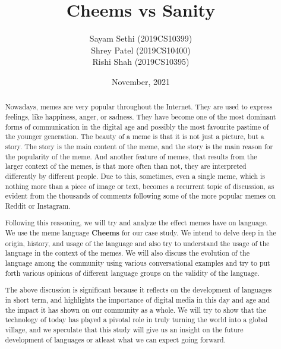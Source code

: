 \documentclass{article}
\title{Cheems vs Sanity}
\author{Sayam Sethi (2019CS10399)\\Shrey Patel (2019CS10400)\\Rishi Shah (2019CS10395)}
\date{November, 2021}
\begin{document}
\maketitle

\tableofcontents

\newpage

\begin{abstract}
    Nowadays, memes are very popular throughout the Internet. They are used to express feelings, like happiness, anger, or sadness. They have become one of the most dominant forms of communication in the digital age and possibly the most favourite pastime of the younger generation. The beauty of a meme is that it is not just a picture, but a story. The story is the main content of the meme, and the story is the main reason for the popularity of the meme. And another feature of memes, that results from the larger context of the memes,  is that more often than not, they are interpreted differently by different people. Due to this, sometimes, even a single meme, which is nothing more than a piece of image or text, becomes a recurrent topic of discussion, as evident from the thousands of comments following some of the more popular memes on Reddit or Instagram.

    Following this reasoning, we will try and analyze the effect memes have on language. We use the meme language \textbf{Cheems} for our case study. We intend to delve deep in the origin, history, and usage of the language and also try to understand the usage of the language in the context of the memes. We will also discuss the evolution of the language among the community using various conversational examples and try to put forth various opinions of different language groups on the validity of the language.

    The above discussion is significant because it reflects on the development of languages in short term, and highlights the importance of digital media in this day and age and the impact it has shown on our community as a whole. We will try to show that the technology of today has played a pivotal role in truly turning the world into a global village, and we speculate that this study will give us an insight on the future development of languages or atleast what we can expect going forward.
\end{abstract}
\end{document}

